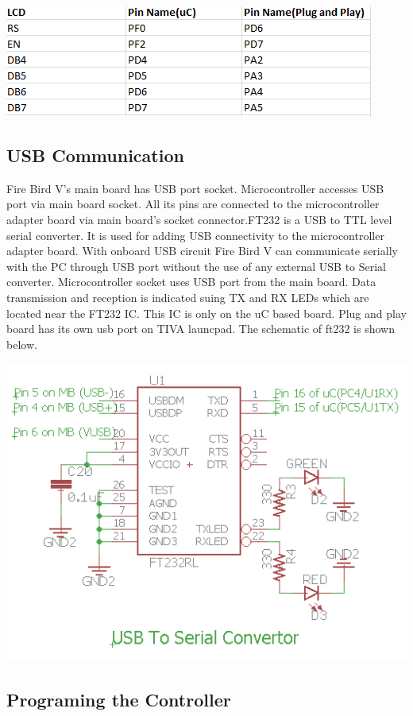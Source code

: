 \documentclass[a4paper,12pt,oneside]{article}
\begin{document}
{\begin{center}
		\includegraphics{Images/lcdpin}
		\end{center}
	\subsection{ \textbf{USB Communication}}
	{Fire Bird V’s main board has USB port socket. Microcontroller accesses USB port via main
		board socket. All its pins are connected to the microcontroller adapter board via main board's
		socket connector.FT232 is a USB to TTL level serial converter. It is used for adding USB connectivity to the
		microcontroller adapter board. With onboard USB circuit Fire Bird V can communicate serially
		with the PC through USB port without the use of any external USB to Serial converter.
		Microcontroller socket uses USB port from the main board. Data transmission and reception is
		indicated suing TX and RX LEDs which are located near the FT232 IC. This IC is only on the uC based board. Plug and play board has its own usb port on TIVA launcpad. The schematic of ft232 is shown below.}
		\begin{center}
		\includegraphics{Images/ft232}\\
		\end{center}
	\subsection{ \textbf{Programing the Controller}}
}
\end{document}
